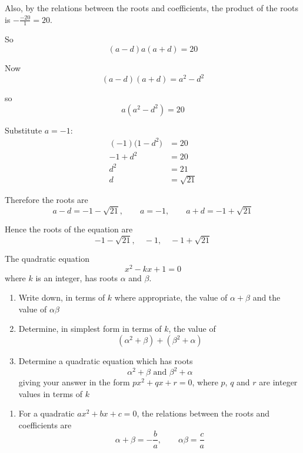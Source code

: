 \documentclass[leqno]{article}
\begin{document}
\begin{enumerate}[
  label=\textbf{\arabic*.},
  leftmargin=*,
  topsep=0pt,
  partopsep=0pt,
  parsep=0pt
]
\begin{djsSolution}
Also, by the relations between the roots and coefficients, the product of the roots is \(-\frac{-20}{1}=20\).

So
\[
(a-d)a(a+d)=20
\]

Now
\[
(a-d)(a+d)=a^2-d^2
\]

so
\[
a(a^2-d^2)=20
\]

Substitute \(a=-1\):
\begin{align*}
(-1)\bigl(1-d^2\bigr)&=20\\
-1+d^2&=20\\
d^2&=21\\
d&=\sqrt{21}
\end{align*}

Therefore the roots are
\[
a-d=-1-\sqrt{21},\qquad a=-1,\qquad a+d=-1+\sqrt{21}
\]

Hence the roots of the equation are
\[
-1-\sqrt{21},\quad -1,\quad -1+\sqrt{21}
\]
\end{djsSolution}


\newpage

\questionitem

The quadratic equation
\[
x^2 - kx + 1 = 0
\]
where $k$ is an integer, has roots $\alpha$ and $\beta$. \\

\begin{enumerate}[label=\textbf{(\alph*)}]
  \item Write down, in terms of $k$ where appropriate, the value of $\alpha + \beta$ and the value of $\alpha\beta$  \\
  \item Determine, in simplest form in terms of $k$, the value of
  \[
  (\alpha^2 + \beta) + (\beta^2 + \alpha)
  \]
  \item Determine a quadratic equation which has roots
  \[
  \alpha^2 + \beta \text{ and } \beta^2 + \alpha
  \]
  giving your answer in the form $px^2 + qx + r = 0$, where $p$, $q$ and $r$ are integer values in terms of $k$  \\
\end{enumerate}

\vspace*{10pt}

\begin{djsSolution}
\begin{enumerate}[label=\textbf{(\alph*)}]
  \item For a quadratic \(ax^2+bx+c=0\), the relations between the roots and coefficients are
  \[
  \alpha+\beta=-\frac{b}{a},
  \qquad
  \alpha\beta=\frac{c}{a}
  \]


\end{enumerate}
\end{djsSolution}
\end{enumerate}
\end{document}
